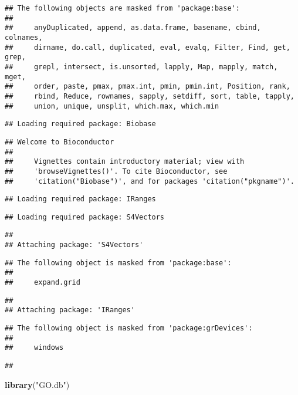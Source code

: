 \documentclass[
]{article}
\newenvironment{Shaded}{\begin{snugshade}}{\end{snugshade}}
\newcommand{\KeywordTok}[1]{\textcolor[rgb]{0.13,0.29,0.53}{\textbf{#1}}}
\newcommand{\NormalTok}[1]{#1}
\newcommand{\StringTok}[1]{\textcolor[rgb]{0.31,0.60,0.02}{#1}}
\begin{document}
\begin{verbatim}
## The following objects are masked from 'package:base':
## 
##     anyDuplicated, append, as.data.frame, basename, cbind, colnames,
##     dirname, do.call, duplicated, eval, evalq, Filter, Find, get, grep,
##     grepl, intersect, is.unsorted, lapply, Map, mapply, match, mget,
##     order, paste, pmax, pmax.int, pmin, pmin.int, Position, rank,
##     rbind, Reduce, rownames, sapply, setdiff, sort, table, tapply,
##     union, unique, unsplit, which.max, which.min
\end{verbatim}

\begin{verbatim}
## Loading required package: Biobase
\end{verbatim}

\begin{verbatim}
## Welcome to Bioconductor
## 
##     Vignettes contain introductory material; view with
##     'browseVignettes()'. To cite Bioconductor, see
##     'citation("Biobase")', and for packages 'citation("pkgname")'.
\end{verbatim}

\begin{verbatim}
## Loading required package: IRanges
\end{verbatim}

\begin{verbatim}
## Loading required package: S4Vectors
\end{verbatim}

\begin{verbatim}
## 
## Attaching package: 'S4Vectors'
\end{verbatim}

\begin{verbatim}
## The following object is masked from 'package:base':
## 
##     expand.grid
\end{verbatim}

\begin{verbatim}
## 
## Attaching package: 'IRanges'
\end{verbatim}

\begin{verbatim}
## The following object is masked from 'package:grDevices':
## 
##     windows
\end{verbatim}

\begin{verbatim}
## 
\end{verbatim}

\begin{Shaded}
\begin{Highlighting}[]
\KeywordTok{library}\NormalTok{(}\StringTok{"GO.db"}\NormalTok{)}
\end{Highlighting}
\end{Shaded}
\end{document}
